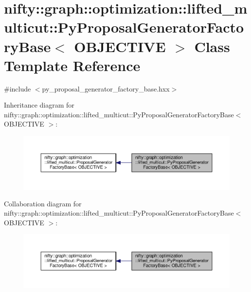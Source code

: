 \hypertarget{classnifty_1_1graph_1_1optimization_1_1lifted__multicut_1_1PyProposalGeneratorFactoryBase}{}\section{nifty\+:\+:graph\+:\+:optimization\+:\+:lifted\+\_\+multicut\+:\+:Py\+Proposal\+Generator\+Factory\+Base$<$ O\+B\+J\+E\+C\+T\+I\+V\+E $>$ Class Template Reference}
\label{classnifty_1_1graph_1_1optimization_1_1lifted__multicut_1_1PyProposalGeneratorFactoryBase}


{\ttfamily \#include $<$py\+\_\+proposal\+\_\+generator\+\_\+factory\+\_\+base.\+hxx$>$}



Inheritance diagram for nifty\+:\+:graph\+:\+:optimization\+:\+:lifted\+\_\+multicut\+:\+:Py\+Proposal\+Generator\+Factory\+Base$<$ O\+B\+J\+E\+C\+T\+I\+V\+E $>$\+:\nopagebreak
\begin{figure}[H]
\begin{center}
\leavevmode
\includegraphics[width=350pt]{classnifty_1_1graph_1_1optimization_1_1lifted__multicut_1_1PyProposalGeneratorFactoryBase__inherit__graph}
\end{center}
\end{figure}


Collaboration diagram for nifty\+:\+:graph\+:\+:optimization\+:\+:lifted\+\_\+multicut\+:\+:Py\+Proposal\+Generator\+Factory\+Base$<$ O\+B\+J\+E\+C\+T\+I\+V\+E $>$\+:\nopagebreak
\begin{figure}[H]
\begin{center}
\leavevmode
\includegraphics[width=350pt]{classnifty_1_1graph_1_1optimization_1_1lifted__multicut_1_1PyProposalGeneratorFactoryBase__coll__graph}
\end{center}
\end{figure}
